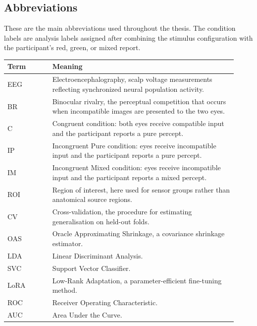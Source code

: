 \documentclass[11pt,a4paper,chapterprefix=false,parskip=false]{scrreprt}
\begin{document}
\begin{appendices}

    \chapter{Abbreviations}
    \label{app:abbreviations}
    These are the main abbreviations used throughout the thesis. The condition labels are analysis labels assigned after combining the stimulus configuration with the participant's red, green, or mixed report.


    \begin{longtable}{p{0.18\linewidth}p{0.74\linewidth}}
        \toprule
        Term & Meaning                                                                                                           \\
        \midrule
        EEG  & Electroencephalography, scalp voltage measurements reflecting synchronized neural population activity.            \\
        BR   & Binocular rivalry, the perceptual competition that occurs when incompatible images are presented to the two eyes. \\
        C    & Congruent condition: both eyes receive compatible input and the participant reports a pure percept.               \\
        IP   & Incongruent Pure condition: eyes receive incompatible input and the participant reports a pure percept.           \\
        IM   & Incongruent Mixed condition: eyes receive incompatible input and the participant reports a mixed percept.         \\
        ROI  & Region of interest, here used for sensor groups rather than anatomical source regions.                            \\
        CV   & Cross-validation, the procedure for estimating generalisation on held-out folds.                                  \\
        OAS  & Oracle Approximating Shrinkage, a covariance shrinkage estimator.                                                 \\
        LDA  & Linear Discriminant Analysis.                                                                                     \\
        SVC  & Support Vector Classifier.                                                                                        \\
        LoRA & Low-Rank Adaptation, a parameter-efficient fine-tuning method.                                                    \\
        ROC  & Receiver Operating Characteristic.                                                                                \\
        AUC  & Area Under the Curve.                                                                                             \\
        \bottomrule
    \end{longtable}


\end{appendices}
\end{document}
